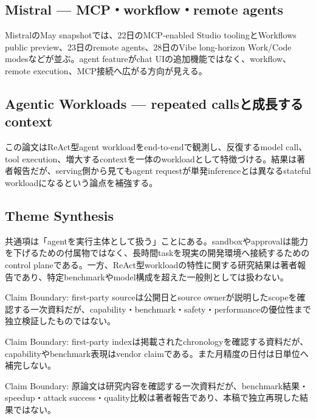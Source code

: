 \subsection{Mistral — MCP・workflow・remote agents}

MistralのMay snapshotでは、22日のMCP-enabled Studio toolingとWorkflows public preview、23日のremote agents、28日のVibe long-horizon Work/Code modesなどが並ぶ。agent featureがchat UIの追加機能ではなく、workflow、remote execution、MCP接続へ広がる方向が見える。\autocite{src-d8b7c1c36830}


\subsection{Agentic Workloads — repeated callsと成長するcontext}

この論文はReAct型agent workloadをend-to-endで観測し、反復するmodel call、tool execution、増大するcontextを一体のworkloadとして特徴づける。結果は著者報告だが、serving側から見てもagent requestが単発inferenceとは異なるstateful workloadになるという論点を補強する。\autocite{src-ac04c00cf21f}


\subsection{Theme Synthesis}

共通項は「agentを実行主体として扱う」ことにある。sandboxやapprovalは能力を下げるための付属物ではなく、長時間taskを現実の開発環境へ接続するためのcontrol planeである。一方、ReAct型workloadの特性に関する研究結果は著者報告であり、特定benchmarkやmodel構成を超えた一般則としては扱わない。\autocite{src-4a3442a5ca8c,src-66be12207714,src-9191d43918fc,src-ac04c00cf21f,src-d8b7c1c36830}


\begin{claimboundary}
Claim Boundary: first-party sourceは公開日とsource ownerが説明したscopeを確認する一次資料だが、capability・benchmark・safety・performanceの優位性まで独立検証したものではない。\autocite{src-4a3442a5ca8c,src-66be12207714,src-9191d43918fc,src-ac04c00cf21f,src-d8b7c1c36830}
\end{claimboundary}

\begin{claimboundary}
Claim Boundary: first-party indexは掲載されたchronologyを確認する資料だが、capabilityやbenchmark表現はvendor claimである。また月精度の日付は日単位へ補完しない。\autocite{src-4a3442a5ca8c,src-66be12207714,src-9191d43918fc,src-ac04c00cf21f,src-d8b7c1c36830}
\end{claimboundary}

\begin{claimboundary}
Claim Boundary: 原論文は研究内容を確認する一次資料だが、benchmark結果・speedup・attack success・quality比較は著者報告であり、本稿で独立再現した結果ではない。\autocite{src-4a3442a5ca8c,src-66be12207714,src-9191d43918fc,src-ac04c00cf21f,src-d8b7c1c36830}
\end{claimboundary}
